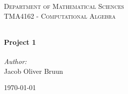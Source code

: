 
\begin{titlepage}
\vbox{ }
\vbox{ }
\begin{center}
  \vspace{5cm}
  \textsc{\LARGE Department of Mathematical Sciences}\\[1.5cm]
  \textsc{\Large TMA4162 - Computational Algebra}\\[0.5cm]
  \vbox{ }

  \HRule \\[0.4cm]
  { \huge \bfseries Project 1}\\[0.4cm]
  \HRule \\[1.5cm]

  \large
  \emph{Author:}\\
  Jacob Oliver Bruun
  \vfill

  {\large \today}
\end{center}
\end{titlepage}

